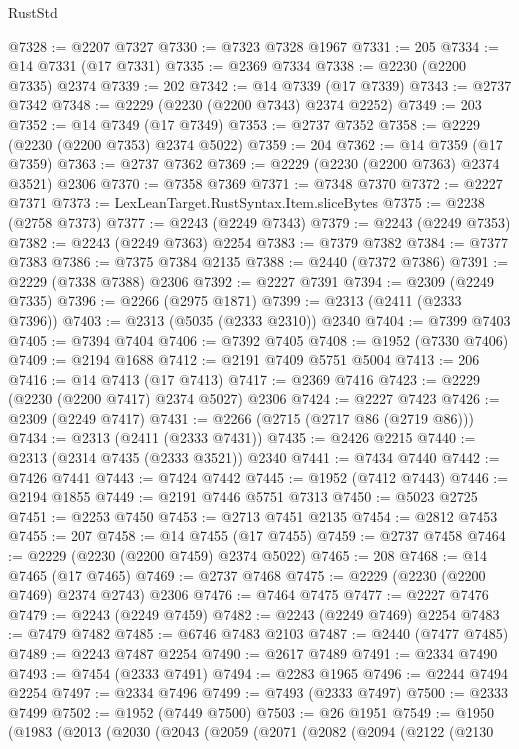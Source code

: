 \begin{lexlean}{RustStd}
\begin{coremodule}
@7328 := @2207 @7327
@7330 := @7323 @7328 @1967
@7331 := 205
@7334 := @14 @7331 (@17 @7331)
@7335 := @2369 @7334
@7338 := @2230 (@2200 @7335) @2374
@7339 := 202
@7342 := @14 @7339 (@17 @7339)
@7343 := @2737 @7342
@7348 := @2229 (@2230 (@2200 @7343) @2374 @2252)
@7349 := 203
@7352 := @14 @7349 (@17 @7349)
@7353 := @2737 @7352
@7358 := @2229 (@2230 (@2200 @7353) @2374 @5022)
@7359 := 204
@7362 := @14 @7359 (@17 @7359)
@7363 := @2737 @7362
@7369 := @2229 (@2230 (@2200 @7363) @2374 @3521) @2306
@7370 := @7358 @7369
@7371 := @7348 @7370
@7372 := @2227 @7371
@7373 := LexLeanTarget.RustSyntax.Item.sliceBytes
@7375 := @2238 (@2758 @7373)
@7377 := @2243 (@2249 @7343)
@7379 := @2243 (@2249 @7353)
@7382 := @2243 (@2249 @7363) @2254
@7383 := @7379 @7382
@7384 := @7377 @7383
@7386 := @7375 @7384 @2135
@7388 := @2440 (@7372 @7386)
@7391 := @2229 (@7338 @7388) @2306
@7392 := @2227 @7391
@7394 := @2309 (@2249 @7335)
@7396 := @2266 (@2975 @1871)
@7399 := @2313 (@2411 (@2333 @7396))
@7403 := @2313 (@5035 (@2333 @2310)) @2340
@7404 := @7399 @7403
@7405 := @7394 @7404
@7406 := @7392 @7405
@7408 := @1952 (@7330 @7406)
@7409 := @2194 @1688
@7412 := @2191 @7409 @5751 @5004
@7413 := 206
@7416 := @14 @7413 (@17 @7413)
@7417 := @2369 @7416
@7423 := @2229 (@2230 (@2200 @7417) @2374 @5027) @2306
@7424 := @2227 @7423
@7426 := @2309 (@2249 @7417)
@7431 := @2266 (@2715 (@2717 @86 (@2719 @86)))
@7434 := @2313 (@2411 (@2333 @7431))
@7435 := @2426 @2215
@7440 := @2313 (@2314 @7435 (@2333 @3521)) @2340
@7441 := @7434 @7440
@7442 := @7426 @7441
@7443 := @7424 @7442
@7445 := @1952 (@7412 @7443)
@7446 := @2194 @1855
@7449 := @2191 @7446 @5751 @7313
@7450 := @5023 @2725
@7451 := @2253 @7450
@7453 := @2713 @7451 @2135
@7454 := @2812 @7453
@7455 := 207
@7458 := @14 @7455 (@17 @7455)
@7459 := @2737 @7458
@7464 := @2229 (@2230 (@2200 @7459) @2374 @5022)
@7465 := 208
@7468 := @14 @7465 (@17 @7465)
@7469 := @2737 @7468
@7475 := @2229 (@2230 (@2200 @7469) @2374 @2743) @2306
@7476 := @7464 @7475
@7477 := @2227 @7476
@7479 := @2243 (@2249 @7459)
@7482 := @2243 (@2249 @7469) @2254
@7483 := @7479 @7482
@7485 := @6746 @7483 @2103
@7487 := @2440 (@7477 @7485)
@7489 := @2243 @7487 @2254
@7490 := @2617 @7489
@7491 := @2334 @7490
@7493 := @7454 (@2333 @7491)
@7494 := @2283 @1965
@7496 := @2244 @7494 @2254
@7497 := @2334 @7496
@7499 := @7493 (@2333 @7497)
@7500 := @2333 @7499
@7502 := @1952 (@7449 @7500)
@7503 := @26 @1951
@7549 := @1950
    (@1983
      (@2013
        (@2030
          (@2043
            (@2059
              (@2071
                (@2082
                  (@2094
                    (@2122
                      (@2130

\end{coremodule}
\end{lexlean}
